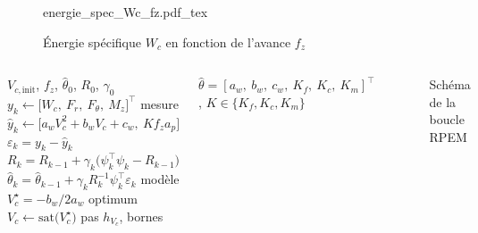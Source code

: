 \documentclass{style/presentation}
\begin{document}
\begin{frame}

    \begin{figure}
        \centering
        \def\svgwidth{.7\textwidth}
        {energie_spec_Wc_fz.pdf_tex}
        \caption{Énergie spécifique $W_c$ en fonction de l'avance $f_z$}
    \end{figure}
\end{frame}

\begin{frame}

    \begin{columns}[c]
        {\small
        \begin{algorithmic}[1]
            \Require $V_{c,\text{init}}$, $f_z$, $\hat{\theta}_0$, $R_0$, $\gamma_0$
            \Do
                \State $y_k \gets \bigl[W_c,\ F_r,\ F_\theta,\ M_z\bigr]^\top$ \hfill {\footnotesize\color{jvgris}mesure}
                \State $\hat{y}_k \gets \bigl[a_w V_c^2 + b_w V_c + c_w,\ K f_z a_p\bigr]$
                \State $\varepsilon_k = y_k - \hat{y}_k$
                \State $R_k = R_{k-1} + \gamma_k\bigl(\psi_k^\top \psi_k - R_{k-1}\bigr)$
                \State $\hat{\theta}_k = \hat{\theta}_{k-1} + \gamma_k R_k^{-1} \psi_k^\top \varepsilon_k$ \hfill {\footnotesize\color{jvgris}modèle}
                \State \alert{$V_c^\star = -b_w / 2a_w$} \hfill {\footnotesize\color{jvgris}optimum}
                \State $V_c \gets \mathrm{sat}\bigl(V_c^\star\bigr)$ \hfill {\footnotesize\color{jvgris}pas $h_{V_c}$, bornes}
        \end{algorithmic}}
        \vspace{1mm}
        {\footnotesize\color{jvgris} $\hat{\theta} = [a_w,\ b_w,\ c_w,\ K_f,\ K_c,\ K_m]^\top$, \quad $K \in \{K_f, K_c, K_m\}$\par}
        \begin{figure}
            \centering
            \resizebox{\linewidth}{!}{}
            \caption{Schéma de la boucle RPEM}
        \end{figure}

    \end{columns}
\end{frame}
\end{document}
